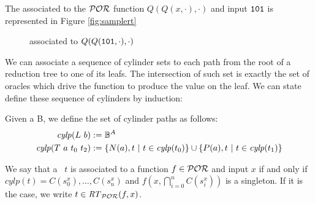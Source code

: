 \begin{conditional}{\notappendix}
  \begin{example}
    The \rt {\Ss} associated to the $\mathcal{POR}$ function $Q(Q(x, \cdot), \cdot)$ and input $\mathtt{1}\mathtt{0}\mathtt{1}$
    is represented in Figure \ref{fig:samplert}
  \end{example}

  \begin{figure}[]
    \caption{\rt {\Ss} {\Ss} associated to $Q(Q(\mathtt{1}\mathtt{0}\mathtt{1}, \cdot), \cdot)$
    \label{fig:samplert}}
    \label{}
  \end{figure}

  We can associate a sequence of cylinder sets to each path from the root
  of a reduction tree to one of its leafs. The intersection of such set is exactly
  the set of oracles which drive the function to produce the value on the leaf.
  We can state define these sequence of cylinders by induction:

  \begin{defn}
    Given a  {B}, we define the set of cylinder paths as follows:
    \begin{align*}
      \mathit{cylp}(L\ b) &:= \mathbb{B}^A\\
      \mathit{cylp}(T\ a\ t_0\ t_2) &:= \{N(a),t~ |~ t \in \mathit{cylp}(t_0)\} \cup \{P(a),t ~|~ t \in \mathit{cylp}(t_1)\}
    \end{align*}
  \end{defn}

  \begin{defn}
    We say that a \rt \Ss \Ss\  $t$ is associated to a function $f \in \mathcal{POR}$ and
    input $x$ if and only if $\mathit{cylp}(t)= C(s^x_0), \ldots,  C(s^x_n)$
    and $f(x,\bigcap_{i=0}^n C(s^x_i))$ is a singleton. If it is the case, we write
    $t \in \mathit{RT}_{\mathcal{POR}}(f, x)$.
  \end{defn}



\end{conditional}
